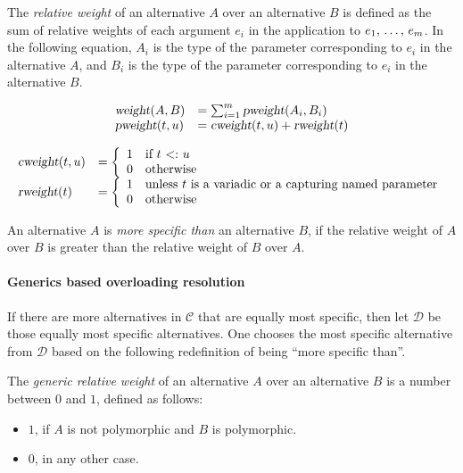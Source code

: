 \begin{definition}
The {\em relative weight} of an alternative $A$ over an alternative $B$ is defined as the sum of relative weights of each argument $e_i$ in the application to $e_1 ,\, \ldots ,\, e_m$. In the following equation, $A_i$ is the type of the parameter corresponding to $e_i$ in the alternative $A$, and $B_i$ is the type of the parameter corresponding to $e_i$ in the alternative $B$. 

\[\begin{array}{l l}
\mbox{\sl weight}(A, B) &= \sum_{i=1}^{m} \mbox{\sl pweight}(A_i, B_i) \\
\mbox{\sl pweight}(t, u) &= \mbox{\sl cweight}(t, u) + \mbox{\sl rweight}(t)
\end{array}
\]

\[\begin{array}{l l}
\cweight(t, u) &= \left\{ 
  \begin{array}{l l}
    1 & \textrm{if $t \conforms u$}\\
    0 & \textrm{otherwise}
  \end{array} \right. \\
\rweight(t) &= \left\{ 
  \begin{array}{l l}
    1 & \textrm{unless $t$ is a variadic or a capturing named parameter}\\
    0 & \textrm{otherwise}
  \end{array} \right.
\end{array}\]
\end{definition}

An alternative $A$ is {\em more specific than} an alternative $B$, if the relative weight of $A$ over $B$ is greater than the relative weight of $B$ over $A$. 

\paragraph{Generics based overloading resolution}
If there are more alternatives in $\mathcal{C}$ that are equally most specific, then let $\mathcal{D}$ be those equally most specific alternatives. One chooses the most specific alternative from $\mathcal{D}$ based on the following redefinition of being ``more specific than''. 

\begin{definition}
The {\em generic relative weight} of an alternative $A$ over an alternative $B$ is a number between $0$ and $1$, defined as follows:
\begin{itemize}
  \item $1$, if $A$ is not polymorphic and $B$ is polymorphic. 
  \item $0$, in any other case. 
\end{itemize}
\end{definition}

